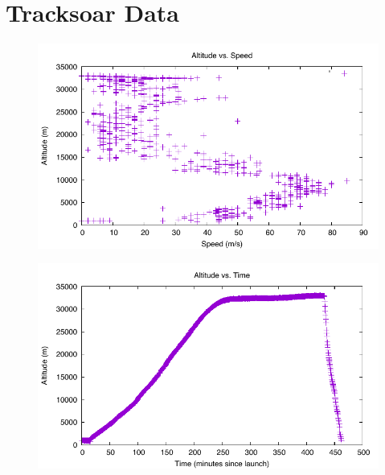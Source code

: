 \documentclass[english]{report}
\begin{document}
\chapter{Tracksoar Data}
\label{tracksoar-data}


\begin{figure}[H]
\begin{centering}
\includegraphics{./tracksoar/altitude-speed}
\par\end{centering}
\caption{}
\label{ts:altitude-speed}
\end{figure}

\begin{figure}[H]
\begin{centering}
\includegraphics{./tracksoar/altitude-time}
\par\end{centering}
\caption{}
\label{ts:altitude-time}
\end{figure}
\end{document}

